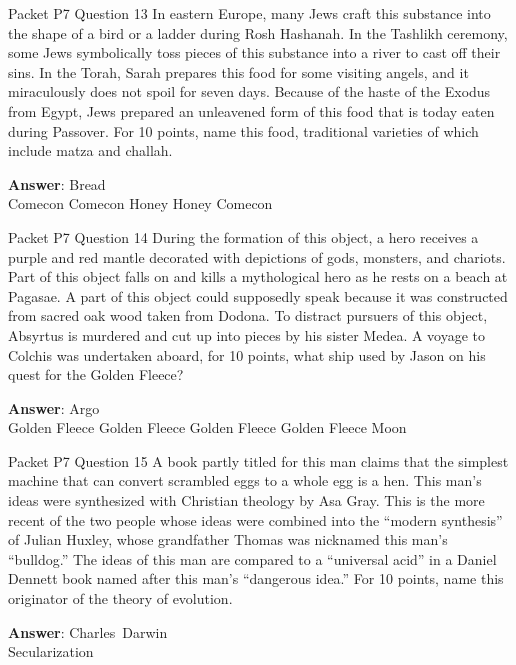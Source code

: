 \begin{frame}{Packet P7 Question 13}
In eastern Europe, many     Jews craft this substance into the shape of a bird or a ladder during Rosh Hashanah. In the Tashlikh ceremony, some Jews symbolically toss pieces of this substance into a river to cast off their sins. In the Torah, Sarah prepares this food for some visiting angels, and it miraculously does not spoil for seven days. Because of the haste of the Exodus from Egypt, Jews prepared an unleavened form of this food that is today eaten during Passover.   For 10 points, name this food, traditional varieties of which include matza and challah.        

\textbf{Answer}: Bread\\
 Comecon
 Comecon
 Honey
 Honey
 Comecon
\end{frame}

\begin{frame}{Packet P7 Question 14}
During the formation of this object, a hero receives a purple and red mantle decorated with depictions of gods, monsters, and chariots. Part of this object falls on and kills a mythological hero as he rests on a beach at Pagasae. A part of this object could supposedly speak because it was constructed from sacred oak wood taken from Dodona. To distract pursuers of this object, Absyrtus is murdered and   cut up into pieces by his sister Medea. A voyage to Colchis was undertaken aboard, for 10 points, what ship used by Jason on his quest for   the Golden Fleece?        

\textbf{Answer}: Argo\\
 Golden Fleece
 Golden Fleece
 Golden Fleece
 Golden Fleece
 Moon
\end{frame}

\begin{frame}{Packet P7 Question 15}
A book partly titled for   this man claims that the simplest machine that can convert scrambled eggs to a whole egg is a hen. This man’s ideas were synthesized with Christian theology by Asa Gray. This is the more recent of the two people whose ideas were combined into the “modern synthesis” of Julian Huxley, whose grandfather Thomas was nicknamed this man’s “bulldog.”   The ideas of this man are compared to a “universal acid” in a Daniel Dennett   book named after this man’s “dangerous   idea.” For 10 points, name this originator of the theory   of evolution.

\textbf{Answer}: Charles\ Darwin\\
 Secularization
\end{frame}

